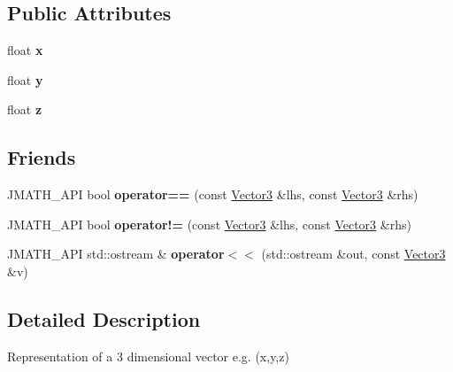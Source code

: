 \subsection*{Public Attributes}
\begin{DoxyCompactItemize}
\item 
\hypertarget{class_vector3_a7e2d3237b29a2f29d7b3d8b2934e35f2}{float {\bfseries x}}\label{class_vector3_a7e2d3237b29a2f29d7b3d8b2934e35f2}

\item 
\hypertarget{class_vector3_a86eb35a9fa2d5a49e7fad66a35fa9c13}{float {\bfseries y}}\label{class_vector3_a86eb35a9fa2d5a49e7fad66a35fa9c13}

\item 
\hypertarget{class_vector3_aa8c9461eb24bd2c364258078811a3e9d}{float {\bfseries z}}\label{class_vector3_aa8c9461eb24bd2c364258078811a3e9d}

\end{DoxyCompactItemize}
\subsection*{Friends}
\begin{DoxyCompactItemize}
\item 
\hypertarget{class_vector3_ad585a11261eb0294a74dd01ae40c3a32}{J\+M\+A\+T\+H\+\_\+\+A\+P\+I bool {\bfseries operator==} (const \hyperlink{class_vector3}{Vector3} \&lhs, const \hyperlink{class_vector3}{Vector3} \&rhs)}\label{class_vector3_ad585a11261eb0294a74dd01ae40c3a32}

\item 
\hypertarget{class_vector3_ac1ae50d88c38b65b76ca8647d36eabd5}{J\+M\+A\+T\+H\+\_\+\+A\+P\+I bool {\bfseries operator!=} (const \hyperlink{class_vector3}{Vector3} \&lhs, const \hyperlink{class_vector3}{Vector3} \&rhs)}\label{class_vector3_ac1ae50d88c38b65b76ca8647d36eabd5}

\item 
\hypertarget{class_vector3_af204d4784bbafe740eff22fa95c96799}{J\+M\+A\+T\+H\+\_\+\+A\+P\+I std\+::ostream \& {\bfseries operator$<$$<$} (std\+::ostream \&out, const \hyperlink{class_vector3}{Vector3} \&v)}\label{class_vector3_af204d4784bbafe740eff22fa95c96799}

\end{DoxyCompactItemize}


\subsection{Detailed Description}
Representation of a 3 dimensional vector e.\+g. (x,y,z) 

